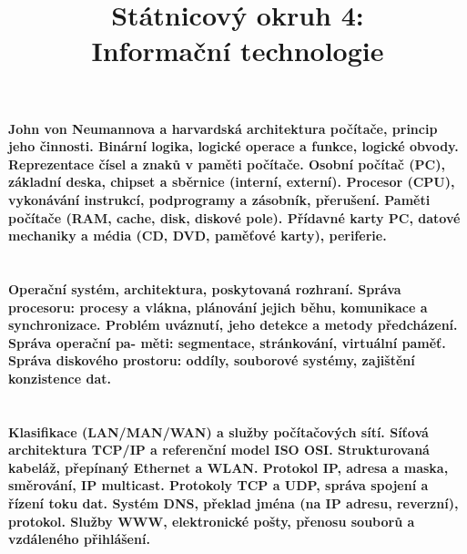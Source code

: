 \documentclass[10pt,a4paper]{article}
\begin{document}
\title{Státnicový okruh 4: \\ Informační technologie}
\maketitle
\newpage
\tableofcontents
\newpage

\section{}
\paragraph{John von Neumannova a harvardská architektura počítače, princip jeho činnosti. Binární logika, logické operace a funkce, logické obvody. Reprezentace čísel a znaků v paměti počítače. Osobní počítač (PC), základní deska, chipset a sběrnice (interní, externí). Procesor (CPU), vykonávání instrukcí, podprogramy a zásobník, přerušení. Paměti počítače (RAM, cache, disk, diskové pole). Přídavné karty PC, datové mechaniky a média (CD, DVD, paměťové karty), periferie.}



\newpage
\section{}
\paragraph{Operační systém, architektura, poskytovaná rozhraní. Správa procesoru: procesy a vlákna, plánování jejich
běhu, komunikace a synchronizace. Problém uváznutí, jeho detekce a metody předcházení. Správa operační pa-
měti: segmentace, stránkování, virtuální paměť. Správa diskového prostoru: oddíly, souborové systémy, zajištění
konzistence dat.}




\newpage
\section{}
\paragraph{Klasifikace (LAN/MAN/WAN) a služby počítačových sítí. Síťová architektura TCP/IP a referenční model
ISO OSI. Strukturovaná kabeláž, přepínaný Ethernet a WLAN. Protokol IP, adresa a maska, směrování, IP
multicast. Protokoly TCP a UDP, správa spojení a řízení toku dat. Systém DNS, překlad jména (na IP adresu,
reverzní), protokol. Služby WWW, elektronické pošty, přenosu souborů a vzdáleného přihlášení.}
\end{document}
